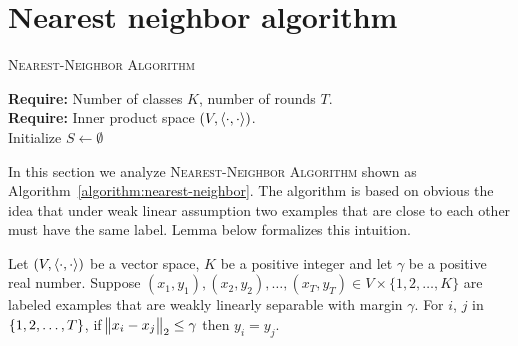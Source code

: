 \section{Nearest neighbor algorithm}
\label{section:nearest-neighbor-algorithm}

\begin{algorithm}[H]
\SetAlgoLined
\LinesNumbered
\caption{\textsc{Nearest-Neighbor Algorithm}
\label{algorithm:nearest-neighbor}
}
\textbf{Require:} Number of classes $K$, number of rounds $T$. \\
\textbf{Require:} Inner product space $(V,\left\langle \cdot, \cdot \right\rangle)$. \\
\nl Initialize $S \gets \emptyset$ \\
\nl {}
\end{algorithm}

In this section we analyze \textsc{Nearest-Neighbor Algorithm} shown as
Algorithm~\ref{algorithm:nearest-neighbor}. The algorithm is based on obvious
the idea that under weak linear assumption two examples that are close to each
other must have the same label. Lemma below formalizes this intuition.

\begin{lemma}
\label{lemma:separation-lemma}
Let $(V,\left\langle \cdot, \cdot \right\rangle)$ be a vector space, $K$ be a positive integer and let
$\gamma$ be a positive real number. Suppose $(x_1,y_1), (x_2,y_2), \dots, (x_T,
y_T) \in V \times \{1,2,\dots,K\}$ are labeled examples that are weakly linearly
separable with margin $\gamma$. For $i$, $j$ in $\cbr{1,2,\dots,T}$, if
$\norm{x_i - x_j}_2 \le \gamma$ then $y_i = y_j$.
\end{lemma}

